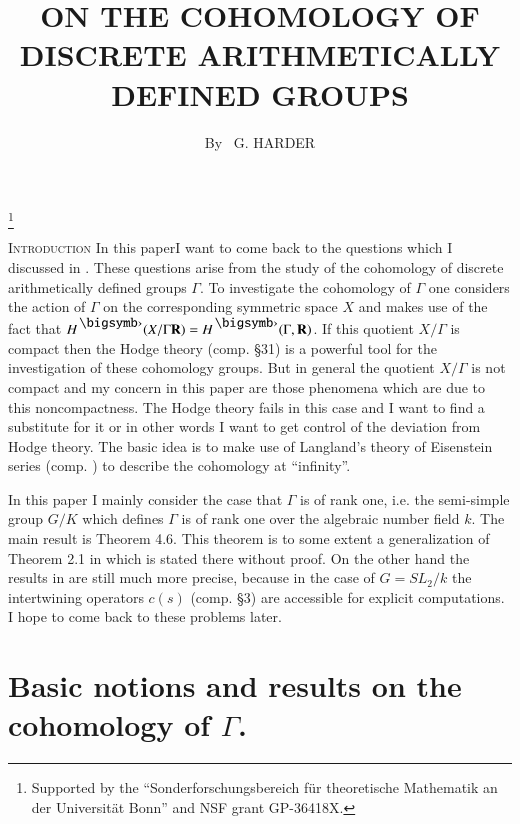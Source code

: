 
\title{ON THE COHOMOLOGY OF DISCRETE ARITHMETICALLY DEFINED GROUPS}\footnote{Supported by the ``Sonderforschungsbereich f\"ur theoretische Mathematik an der Universit\"at Bonn'' and NSF grant GP-36418X.}

\author{By~ G. HARDER} 

\date{}
\maketitle


\setcounter{pageoriginal}{128}

\textsc{Introduction}
In this paper\pageoriginale I want to come back to the questions which I discussed in \cite{art5-key7}. These questions arise from the study of the cohomology of discrete arithmetically defined groups $\Gamma$. To investigate the cohomology of $\Gamma$ one considers the action of $\Gamma$ on the corresponding symmetric space $X$ and makes use of the fact that $H^\bigdot (X / \Gamma \bR) = H^\bigdot (\Gamma, \bR)$. If this quotient $X / \Gamma$ is compact then the Hodge theory (comp. \cite{art5-key12} \S 31) is a powerful tool for the investigation of these cohomology groups. But in general the quotient $X/ \Gamma$ is not compact and my concern in this paper are those phenomena which are due to this noncompactness. The Hodge theory fails in this case and I want to find a substitute for it or in other words I want to get control of the deviation from Hodge theory. The basic idea is to make use of Langland's theory of Eisenstein series (comp. \cite{art5-key8}) to describe the cohomology at ``infinity''.

In this paper I mainly consider the case that $\Gamma$ is of rank one, i.e. the semi-simple group $G/ K$ which defines $\Gamma$ is of rank one over the algebraic number field $k$. The main result is Theorem 4.6. This theorem is to some extent a generalization of Theorem 2.1 in \cite{art5-key7} which is stated there without proof. On the other hand the results in \cite{art5-key7} are still much more precise, because in the case of $G = S L_2 / k$ the intertwining operators $c (s)$ (comp. \S 3) are accessible for explicit computations. I hope to come back to these problems later.

\section{Basic notions and results on the cohomology of $\Gamma$.}\label{art5-sec1}

